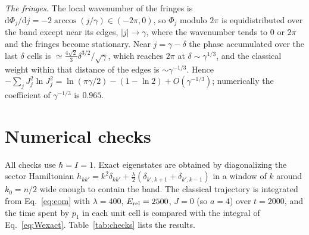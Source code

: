 \documentclass[aps,preprint,12pt,superscriptaddress,nofootinbib]{revtex4-2}
\newcommand{\dd}{\mathrm{d}}
\newcommand{\Erel}{E_{\rm rel}}
\begin{document}
\emph{The fringes.} The local wavenumber of the fringes is
$\dd\Phi_{j}/\dd j=-2\arccos(j/\gamma)\in(-2\pi,0)$, so $\Phi_{j}$ modulo $2\pi$ is
equidistributed over the band except near its edges, $|j|\to\gamma$, where the
wavenumber tends to $0$ or $2\pi$ and the fringes become stationary. Near
$j=\gamma-\delta$ the phase accumulated over the last $\delta$ cells is
$\simeq\frac{4\sqrt2}{3}\delta^{3/2}/\sqrt\gamma$, which reaches $2\pi$ at
$\delta\sim\gamma^{1/3}$, and the classical weight within that distance of the edges is
$\sim\gamma^{-1/3}$. Hence $-\sum_{j}J_{j}^{2}\ln J_{j}^{2}=\ln(\pi\gamma/2)-(1-\ln2)
+O(\gamma^{-1/3})$; numerically the coefficient of $\gamma^{-1/3}$ is $0.965$.

\section{Numerical checks}
\label{app:num}

All checks use $\hbar=I=1$. Exact eigenstates are obtained by diagonalizing the sector
Hamiltonian $h_{kk'}=k^{2}\delta_{kk'}+\frac{\lambda}{2}(\delta_{k',k+1}+\delta_{k',k-1})$
in a window of $k$ around $k_{0}=n/2$ wide enough to contain the band. The classical
trajectory is integrated from Eq.~\eqref{eq:eom} with
$\lambda=400$, $\Erel=2500$, $J=0$ (so $a=4$) over $t=2000$, and the time spent by
$p_{1}$ in each unit cell is compared with the integral of Eq.~\eqref{eq:Wexact}.
Table~\ref{tab:checks} lists the results.
\end{document}
